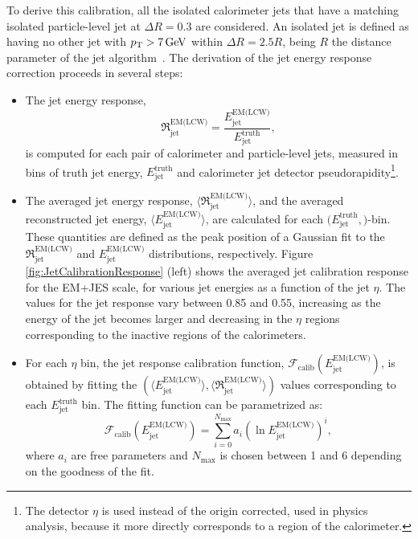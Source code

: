 To derive this calibration, all the isolated calorimeter jets that have a matching isolated particle-level jet at $\Delta R=0.3$ are considered.
An isolated jet is defined as having no other jet with $\pt>\unit[7]{GeV}$ within $\Delta R = 2.5 R$, being $R$ the distance parameter of the jet algorithm~\cite{Aad:2011he}.
The derivation of the jet energy response correction proceeds in several steps:

\begin{itemize}

\item The jet energy response,
    \begin{equation}
    \mathfrak{R}_{\text{jet}}^{\text{EM(LCW)}} = \frac{E_{\text{jet}}^{\text{EM(LCW)}}}{E_{\text{jet}}^{\text{truth}}},
    \label{eq:JetEnergyResponse}
    \end{equation}
    is computed for each pair of calorimeter and particle-level jets, measured in bins of truth jet energy, $E_{\text{jet}}^{\text{truth}}$ and calorimeter jet detector pseudorapidity\footnote{The detector $\eta$ is used instead of the origin corrected, used in physics analysis, because it more directly corresponds to a region of the calorimeter.}.

\item The averaged jet energy response, $\langle \mathfrak{R}_{\text{jet}}^{\text{EM(LCW)}} \rangle$, and the averaged reconstructed jet energy, $\langle E_{\text{jet}}^{\text{EM(LCW)}} \rangle$, are calculated for each $(E_{\text{jet}}^{\text{truth}}, $\eta$)$-bin.
These quantities are defined as the peak position of a Gaussian fit to the $\mathfrak{R}_{\text{jet}}^{\text{EM(LCW)}}$ and $E_{\text{jet}}^{\text{EM(LCW)}}$ distributions, respectively.
Figure \ref{fig:JetCalibrationResponse} (left) shows the averaged jet calibration response for the EM+JES scale, for various jet energies as a function of the jet $\eta$.
The values for the jet response vary between 0.85 and 0.55, increasing as the energy of the jet becomes larger and decreasing in the $\eta$ regions corresponding to the inactive regions of the calorimeters.


\item For each $\eta$ bin, the jet response calibration function, $\mathcal{F}_{\text{calib}}(E_{\text{jet}}^{\text{EM(LCW)}})$, is obtained by fitting the $(\langle E_{\text{jet}}^{\text{EM(LCW)}} \rangle, \langle \mathfrak{R}_{\text{jet}}^{\text{EM(LCW)}} \rangle)$ values corresponding to each $E_{\text{jet}}^{\text{truth}}$ bin.
The fitting function can be parametrized as:
    \begin{equation}
    \mathcal{F}_{\text{calib}}(E_{\text{jet}}^{\text{EM(LCW)}}) = \sum_{i=0}^{N_{\text{max}}}{a_i\left(\ln{E_{\text{jet}}^{\text{EM(LCW)}}}\right)^i},
    \label{eq:JetResponseFunction}
    \end{equation}
\noindent where $a_i$ are free parameters and $N_\text{max}$ is chosen between 1 and 6 depending on the goodness of the fit.

\end{itemize}

